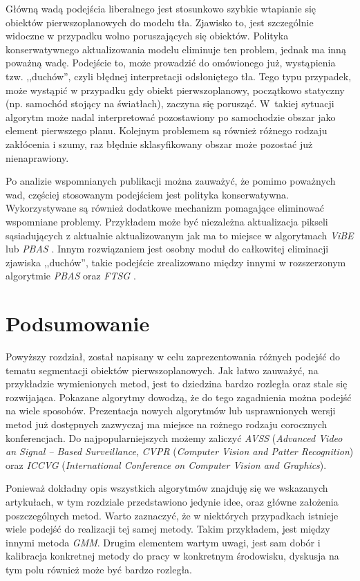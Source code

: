 Główną wadą podejścia liberalnego jest stosunkowo szybkie wtapianie się obiektów pierwszoplanowych do modelu tła. Zjawisko to, jest szczególnie widoczne w przypadku wolno poruszających się obiektów. Polityka konserwatywnego aktualizowania modelu eliminuje ten problem, jednak ma inną poważną wadę. Podejście to, może prowadzić do omówionego już, wystąpienia tzw. ,,duchów'', czyli błędnej interpretacji odsłoniętego tła. Tego typu przypadek, może wystąpić w przypadku gdy obiekt pierwszoplanowy, początkowo statyczny (np. samochód stojący na światłach), zaczyna się porusząć. W~takiej sytuacji algorytm może nadal interpretować pozostawiony po samochodzie obszar jako element pierwszego planu. Kolejnym problemem są również różnego rodzaju zakłócenia i szumy, raz błędnie sklasyfikowany obszar może pozostać już nienaprawiony.

Po analizie wspomnianych publikacji można zauważyć, że pomimo poważnych wad, częściej stosowanym podejściem jest polityka konserwatywna. Wykorzystywane są również dodatkowe mechanizm pomagające eliminować wspomniane problemy. Przykładem może być niezależna aktualizacja pikseli sąsiadujących z aktualnie aktualizowanym jak ma to miejsce w algorytmach \textit{ViBE} \cite{kryjak_13_vibe} lub \textit{PBAS} \cite{kryjak_13_pbas}. Innym rozwiązaniem jest osobny moduł do całkowitej eliminacji zjawiska ,,duchów'', takie podejście zrealizowano między innymi w rozszerzonym algorytmie \textit{PBAS} \cite{kryjak_14_pbas} oraz \textit{FTSG} \cite{wang_14}.

\section{Podsumowanie}
\label{sec:przeglad_podsumowanie}

Powyższy rozdział, został napisany w celu zaprezentowania różnych podejść do tematu segmentacji obiektów pierwszoplanowych. Jak łatwo zauważyć, na przykładzie wymienionych metod, jest to dziedzina bardzo rozległa oraz stale się rozwijająca. Pokazane algorytmy dowodzą, że do tego zagadnienia można podejść na wiele sposobów. Prezentacja nowych algorytmów lub usprawnionych wersji metod już dostępnych zazwyczaj ma miejsce na rożnego rodzaju corocznych konferencjach. Do najpopularniejszych możemy zaliczyć \textit{AVSS} (\textit{Advanced Video an Signal -- Based Surveillance}, \textit{CVPR} (\textit{Computer Vision and Patter Recognition}) oraz \textit{ICCVG} (\textit{International Conference on Computer Vision and Graphics}).

Ponieważ dokładny opis wszystkich algorytmów znajduję się we wskazanych artykułach, w tym rozdziale przedstawiono jedynie idee, oraz główne założenia poszczególnych metod. Warto zaznaczyć, że w niektórych przypadkach istnieje wiele podejść do realizacji tej samej metody. Takim przykładem, jest między innymi metoda \textit{GMM}. Drugim elementem wartym uwagi, jest sam dobór i kalibracja konkretnej metody do pracy w konkretnym środowisku, dyskusja na tym polu również może być bardzo rozległa. 